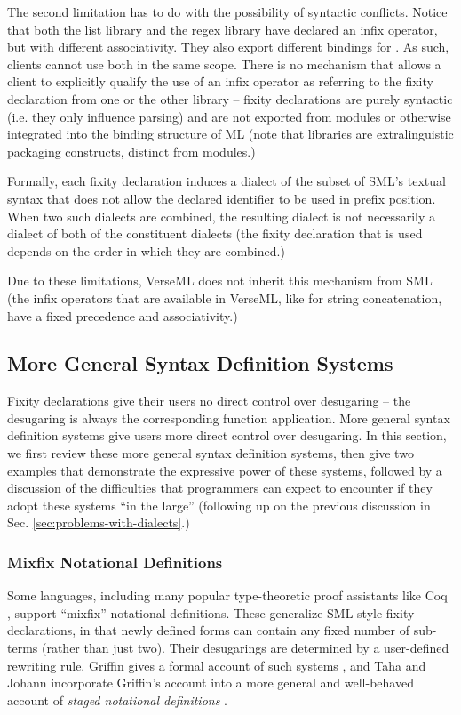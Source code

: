 The second limitation has to do with the possibility of syntactic conflicts. Notice that both the list library and the regex library have declared \li{::} an  infix operator, but with different associativity. They also export different bindings for . As such, clients cannot use both in the same scope. There is no mechanism that allows a client to explicitly qualify the use of an infix operator as referring to the fixity declaration from one or the other library -- fixity declarations are purely syntactic (i.e. they only influence parsing) and are not exported from modules or otherwise integrated into the binding structure of ML (note that libraries are extralinguistic packaging constructs, distinct from modules.) 


Formally, each fixity declaration induces a dialect of the subset of SML's textual syntax that does not allow the declared identifier to be used in prefix position. When two such dialects are combined, the resulting dialect is not necessarily a dialect of both of the constituent dialects (the fixity declaration that is used depends on the order in which they are combined.)

Due to these limitations, VerseML does not inherit this mechanism from SML (the infix operators that are available in VerseML, like \li{^} for string concatenation, have a fixed precedence and associativity.)


\subsection{More General Syntax Definition Systems}\label{sec:syntax-dialects}
Fixity declarations give their users no direct control over desugaring -- the desugaring is always the corresponding function application. More general syntax definition systems give users more direct control over desugaring. In this section, we first review these more general syntax definition systems, then give two examples that demonstrate the expressive power of these systems, followed by a discussion of the difficulties that programmers can expect to encounter if they  adopt these systems ``in the large'' (following up on the previous discussion in Sec. \ref{sec:problems-with-dialects}.)

\subsubsection{Mixfix Notational Definitions}
Some languages, including many popular type-theoretic proof assistants like Coq \cite{Coq:manual}, support ``mixfix'' notational definitions. These generalize SML-style fixity declarations, in that newly defined forms can contain any fixed number of sub-terms (rather than just two). Their desugarings are determined by a user-defined rewriting rule. Griffin gives a formal account of such systems \cite{5134}, and Taha and Johann incorporate Griffin's account into a more general and  well-behaved account of \emph{staged notational definitions} \cite{Taha2003}.


